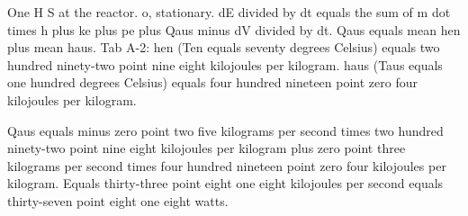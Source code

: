 One H S at the reactor. 
o, stationary. 
dE divided by dt equals the sum of m dot times h plus ke plus pe plus Qaus minus dV divided by dt. 
Qaus equals mean hen plus mean haus. 
Tab A-2: hen (Ten equals seventy degrees Celsius) equals two hundred ninety-two point nine eight kilojoules per kilogram. 
haus (Taus equals one hundred degrees Celsius) equals four hundred nineteen point zero four kilojoules per kilogram. 

Qaus equals minus zero point two five kilograms per second times two hundred ninety-two point nine eight kilojoules per kilogram plus zero point three kilograms per second times four hundred nineteen point zero four kilojoules per kilogram. 
Equals thirty-three point eight one eight kilojoules per second equals thirty-seven point eight one eight watts.